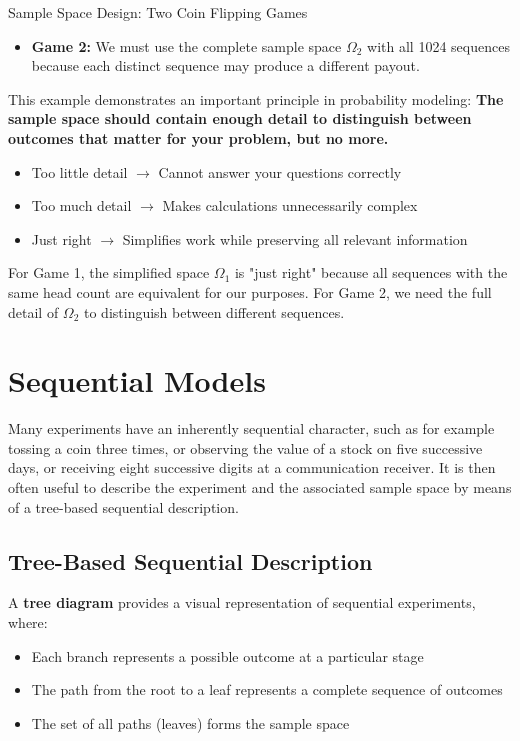 \begin{itemize}
\begin{exampleboxbreak}{Sample Space Design: Two Coin Flipping Games}
\begin{itemize}
    \item \textbf{Game 2:} We must use the complete sample space $\Omega_2$ with all 1024 sequences because each distinct sequence may produce a different payout.
\end{itemize}


This example demonstrates an important principle in probability modeling: \textbf{The sample space should contain enough detail to distinguish between outcomes that matter for your problem, but no more.}

\begin{itemize}
    \item Too little detail $\rightarrow$ Cannot answer your questions correctly
    \item Too much detail $\rightarrow$ Makes calculations unnecessarily complex
    \item Just right $\rightarrow$ Simplifies work while preserving all relevant information
\end{itemize}

For Game 1, the simplified space $\Omega_1$ is "just right" because all sequences with the same head count are equivalent for our purposes. For Game 2, we need the full detail of $\Omega_2$ to distinguish between different sequences.
\end{exampleboxbreak}


\section{Sequential Models}

Many experiments have an inherently sequential character, such as for example tossing a coin three times, or observing the value of a stock on five successive days, or receiving eight successive digits at a communication receiver. It is then often useful to describe the experiment and the associated sample space by means of a tree-based sequential description.

\subsection{Tree-Based Sequential Description}

A \textbf{tree diagram} provides a visual representation of sequential experiments, where:
\begin{itemize}
    \item Each branch represents a possible outcome at a particular stage
    \item The path from the root to a leaf represents a complete sequence of outcomes
    \item The set of all paths (leaves) forms the sample space
\end{itemize}



\end{itemize}
